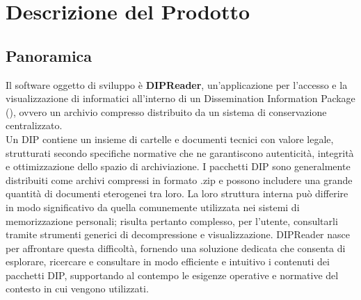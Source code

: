 \section{Descrizione del Prodotto}

\subsection{Panoramica}
Il software oggetto di sviluppo è \textbf{DIPReader}, un'applicazione per l'accesso e la visualizzazione di  informatici all'interno di un Dissemination Information Package (), ovvero un archivio compresso distribuito da un sistema di conservazione centralizzato. \\

\noindent Un DIP contiene un insieme di cartelle e documenti tecnici con valore legale, strutturati secondo specifiche normative che ne garantiscono autenticità, integrità e ottimizzazione dello spazio di archiviazione.
I pacchetti DIP sono generalmente distribuiti come archivi compressi in formato .zip e possono includere una grande quantità di documenti eterogenei tra loro.
La loro struttura interna può differire in modo significativo da quella comunemente utilizzata nei sistemi di memorizzazione personali; risulta pertanto complesso, per l'utente, consultarli tramite strumenti generici di decompressione e visualizzazione.
DIPReader nasce per affrontare questa difficoltà, fornendo una soluzione dedicata che consenta di esplorare, ricercare e consultare in modo efficiente e intuitivo i contenuti dei pacchetti DIP, supportando al contempo le esigenze operative e normative del contesto in cui vengono utilizzati.

